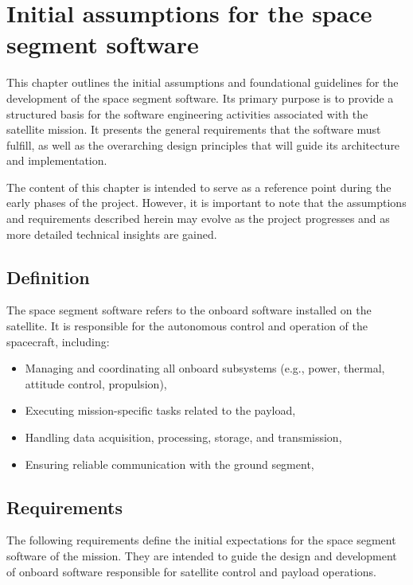 \chapter{Initial assumptions for the space segment software}
\label{chpt:03-01-05-initial-space-segment-sofware}
This chapter outlines the initial assumptions and foundational guidelines for the development of the space segment software. Its primary purpose is to provide a structured basis for the software engineering activities associated with the satellite mission. It presents the general requirements that the software must fulfill, as well as the overarching design principles that will guide its architecture and implementation.

The content of this chapter is intended to serve as a reference point during the early phases of the project. However, it is important to note that the assumptions and requirements described herein may evolve as the project progresses and as more detailed technical insights are gained.

\section{Definition}
The space segment software refers to the onboard software installed on the satellite. It is responsible for the autonomous control and operation of the spacecraft, including:
\begin{itemize}
    \item Managing and coordinating all onboard subsystems (e.g., power, thermal, attitude control, propulsion),
    \item Executing mission-specific tasks related to the payload,
    \item Handling data acquisition, processing, storage, and transmission,
    \item Ensuring reliable communication with the ground segment,
\end{itemize}

\section{Requirements}

The following requirements define the initial expectations for the space segment software of the mission. They are intended to guide the design and development of onboard software responsible for satellite control and payload operations. 


